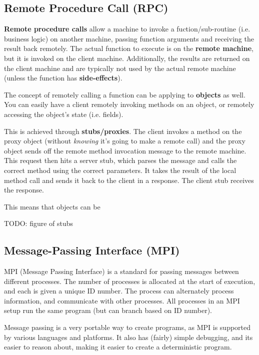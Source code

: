 \documentclass{article}
\begin{document}
\subsection{Remote Procedure Call (RPC)}

\textbf{Remote procedure calls} allow a machine to invoke a fuction/sub-routine (i.e. business logic) on another machine, passing function arguments and receiving the result back remotely. The actual function to execute is on the \textbf{remote machine}, but it is invoked on the client machine. Additionally, the results are returned on the client machine and are typically not used by the actual remote machine (unless the function has \textbf{side-effects}).

The concept of remotely calling a function can be applying to \textbf{objects} as well. You can easily have a client remotely invoking methods on an object, or remotely accessing the object's state (i.e. fields).

This is achieved through \textbf{stubs/proxies}. The client invokes a method on the proxy object (without \textit{knowing} it's going to make a remote call) and the proxy object sends off the remote method invocation message to the remote machine. This request then hits a server stub, which parses the message and calls the correct method using the correct parameters. It takes the result of the local method call and sends it back to the client in  a response. The client stub receives the response.

This means that objects can be 

TODO: figure of stubs

\subsection{Message-Passing Interface (MPI)}

MPI (Message Passing Interface) is a standard for passing messages between different processes. The number of processes is allocated at the start of execution, and each is given a unique ID number. The process can alternately process information, and communicate with other processes. All processes in an MPI setup run the same program (but can branch based on ID number). 

Message passing is a very portable way to create programs, as MPI is supported by various languages and platforms. It also has (fairly) simple debugging, and its easier to reason about, making it easier to create a deterministic program. 
\end{document}
